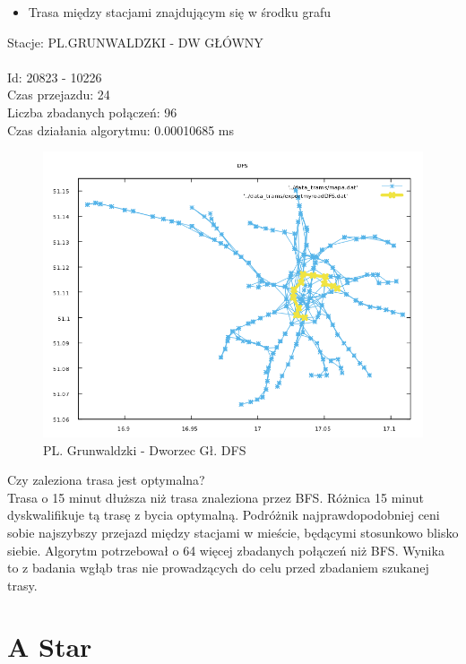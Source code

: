 \documentclass[13pt]{article}
\begin{document}
\newpage
\begin{itemize}
\item Trasa między stacjami znajdującym się w środku grafu
\end{itemize}
\hspace{1.5cm} Stacje: PL.GRUNWALDZKI - DW GŁÓWNY \\\\
Id: 20823  - 10226\\
Czas przejazdu: 24\\
Liczba zbadanych połączeń: 96\\
Czas działania algorytmu: 0.00010685 ms\\
\begin{figure}[hp]
\centering
\includegraphics[width=1\textwidth]{wykresy/PLA_GLO_DFS.png}
\caption{PL. Grunwaldzki - Dworzec Gł. DFS}
\end{figure}

Czy zaleziona trasa jest optymalna?\\
Trasa o 15 minut dłuższa niż trasa znaleziona przez BFS. Różnica 15 minut dyskwalifikuje tą trasę z bycia optymalną. Podróżnik najprawdopodobniej ceni sobie najszybszy przejazd między stacjami w mieście, będącymi stosunkowo blisko siebie. Algorytm potrzebował o 64 więcej zbadanych połączeń niż BFS. Wynika to z badania wgłąb tras nie prowadzących do celu przed zbadaniem szukanej trasy.


\section{A Star}
\end{document}
